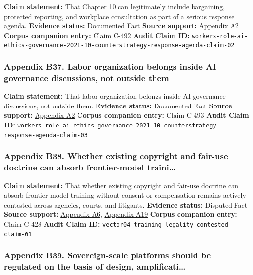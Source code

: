 \documentclass[
  american,
  11pt,
  letterpaper,
]{article}
\begin{document}
\textbf{Claim statement:} That Chapter 10 can legitimately include
bargaining, protected reporting, and workplace consultation as part of a
serious response agenda. \textbf{Evidence status:} Documented Fact
\textbf{Source support:}
\hyperref[ch-10-appendix-a2-in-oxford-handbook-on-ai-governance-the-role-of-workers-in-ai-ethics-and-governance]{Appendix
A2} \textbf{Corpus companion entry:} Claim C-492 \textbf{Audit Claim
ID:}
\texttt{workers-role-ai-ethics-governance-2021-10-counterstrategy-response-agenda-claim-02}

\subsubsection{Appendix B37. Labor organization belongs inside AI
governance discussions, not outside
them}\label{ch-10-appendix-b37-labor-organization-belongs-inside-ai-governance-discussions-not-outside-them}

\textbf{Claim statement:} That labor organization belongs inside AI
governance discussions, not outside them. \textbf{Evidence status:}
Documented Fact \textbf{Source support:}
\hyperref[ch-10-appendix-a2-in-oxford-handbook-on-ai-governance-the-role-of-workers-in-ai-ethics-and-governance]{Appendix
A2} \textbf{Corpus companion entry:} Claim C-493 \textbf{Audit Claim
ID:}
\texttt{workers-role-ai-ethics-governance-2021-10-counterstrategy-response-agenda-claim-03}

\subsubsection{Appendix B38. Whether existing copyright and fair-use
doctrine can absorb frontier-model
traini\ldots{}}\label{ch-10-appendix-b38-whether-existing-copyright-and-fair-use-doctrine-can-absorb-frontier-model-traini}

\textbf{Claim statement:} That whether existing copyright and fair-use
doctrine can absorb frontier-model training without consent or
compensation remains actively contested across agencies, courts, and
litigants. \textbf{Evidence status:} Disputed Fact \textbf{Source
support:}
\hyperref[ch-10-appendix-a6-copyright-and-artificial-intelligence-part-3-generative-ai-training-pre-publication-version]{Appendix
A6},
\hyperref[ch-10-appendix-a19-bartz-et-al-v-anthropic-pbc-order-on-fair-use]{Appendix
A19} \textbf{Corpus companion entry:} Claim C-428 \textbf{Audit Claim
ID:} \texttt{vector04-training-legality-contested-claim-01}

\subsubsection{Appendix B39. Sovereign-scale platforms should be
regulated on the basis of design,
amplificati\ldots{}}\label{ch-10-appendix-b39-sovereign-scale-platforms-should-be-regulated-on-the-basis-of-design-amplificati}
\end{document}
